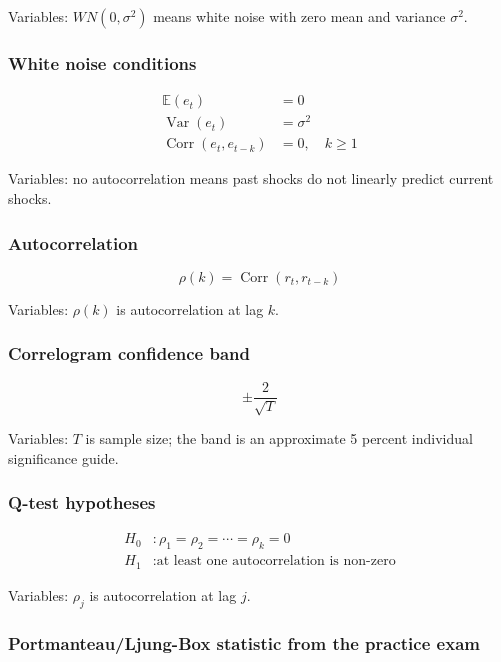 \documentclass[
  8pt,
  twocolumn]{extarticle}
\begin{document}
Variables: \(WN(0,\sigma^2)\) means white noise with zero mean and
variance \(\sigma^2\).

\subsubsection{White noise conditions}\label{white-noise-conditions}

\[
\begin{aligned}
\mathbb E(e_t)&=0\\
\operatorname{Var}(e_t)&=\sigma^2\\
\operatorname{Corr}(e_t,e_{t-k})&=0,\quad k\ge1
\end{aligned}
\]

Variables: no autocorrelation means past shocks do not linearly predict
current shocks.

\subsubsection{Autocorrelation}\label{autocorrelation}

\[
\rho(k)=\operatorname{Corr}(r_t,r_{t-k})
\]

Variables: \(\rho(k)\) is autocorrelation at lag \(k\).

\subsubsection{Correlogram confidence
band}\label{correlogram-confidence-band}

\[
\pm\frac{2}{\sqrt T}
\]

Variables: \(T\) is sample size; the band is an approximate 5 percent
individual significance guide.

\subsubsection{Q-test hypotheses}\label{q-test-hypotheses}

\[
\begin{aligned}
H_0&:\rho_1=\rho_2=\cdots=\rho_k=0\\
H_1&:\text{at least one autocorrelation is non-zero}
\end{aligned}
\]

Variables: \(\rho_j\) is autocorrelation at lag \(j\).

\subsubsection{Portmanteau/Ljung-Box statistic from the practice
exam}\label{portmanteauljung-box-statistic-from-the-practice-exam}
\end{document}
